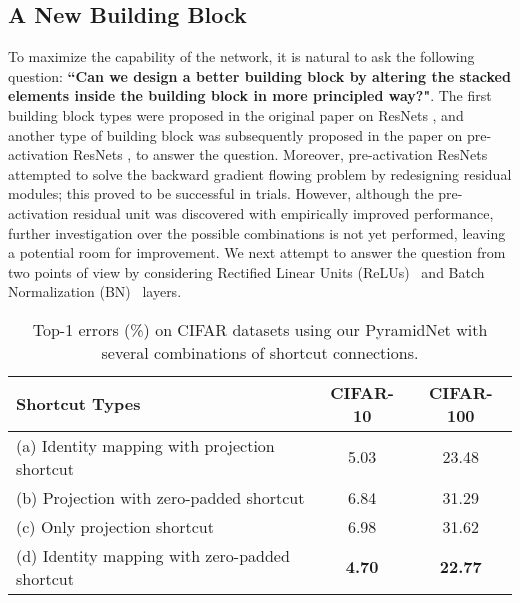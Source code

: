 \documentclass[10pt,twocolumn,letterpaper]{article}
\begin{document}
\subsection{A New Building Block}
\label{ssec:newblock}
To maximize the capability of the network, it is natural to ask the following question: {\bf ``Can we design a better building block by altering the stacked elements inside the building block in more principled way?"}. The first building block types were proposed in the original paper on ResNets \cite{resnet}, and another type of building block was subsequently proposed in the paper on pre-activation ResNets \cite{preresnet}, to answer the question. Moreover, pre-activation ResNets attempted to solve the backward gradient flowing problem \cite{preresnet} by redesigning residual modules; this proved to be successful in trials. However, although the pre-activation residual unit was discovered with empirically improved performance, further investigation over the possible combinations is not yet performed, leaving a potential room for improvement. We next attempt to answer the question from two points of view by considering Rectified Linear Units (ReLUs)~\cite{ReLU} and Batch Normalization (BN)~\cite{BN} layers.



\begin{table}[t]
\footnotesize
\fontsize{7}{8}\selectfont
\begin{center}
\begin{tabular}{|l|c|c|}
\hline
Shortcut Types  & CIFAR-10 & CIFAR-100\\
\hline
(a) Identity mapping with projection shortcut & 5.03 & 23.48\\
(b) Projection with zero-padded shortcut & 6.84 & 31.29 \\
(c) Only projection shortcut & 6.98 & 31.62 \\
(d) Identity mapping with zero-padded shortcut & {\bf4.70}  & {\bf 22.77}\\
\hline
\end{tabular}
\end{center}
\caption{Top-1 errors (\%) on CIFAR datasets using our PyramidNet with several combinations of shortcut connections.}
\label{table:shortcut}
\end{table}
\end{document}
